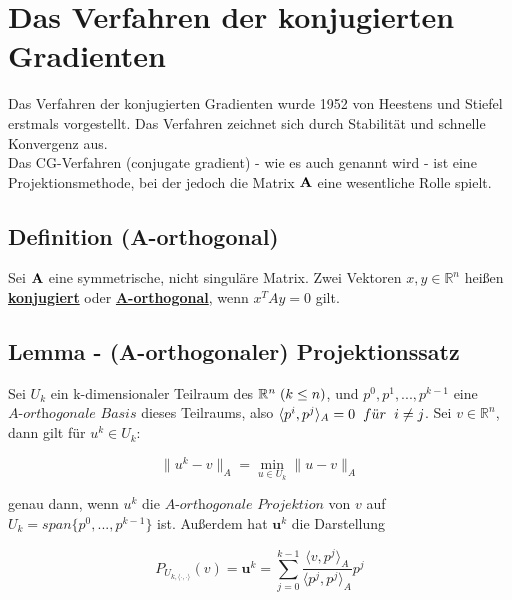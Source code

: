 \label{img.Jacobi3}

\section{Das Verfahren der konjugierten Gradienten}\label{s.Das Verfahren der konjugierten Gradienten}

Das Verfahren der konjugierten Gradienten wurde 1952 von Heestens und Stiefel erstmals vorgestellt. Das Verfahren zeichnet sich durch Stabilität und schnelle Konvergenz aus. \\
Das CG-Verfahren (conjugate gradient) - wie es auch genannt wird - ist eine Projektionsmethode, bei der jedoch die Matrix ${\textbf{A}}$ eine wesentliche Rolle spielt.

\subsection{Definition (A-orthogonal)}\label{ss.A-orthogonal}
Sei ${\textbf{A}}$ eine symmetrische, nicht singuläre Matrix. Zwei Vektoren $x,y \in \mathbb{R}^{n}$ heißen \underline{\textbf{konjugiert}} oder \underline{\textbf{A-orthogonal}}, wenn $x^{T}Ay = 0$ gilt.

\subsection{Lemma - (A-orthogonaler) Projektionssatz}\label{s.Projektionssatz}

Sei $U_{k}$ ein k-dimensionaler Teilraum des $\mathbb{R}^{n} \hspace{1mm} (k \le n)$, und $p^{0}, p^{1},...,p^{k-1}$ eine $\textit{A-orthogonale Basis}$ dieses Teilraums, also $\langle p^{i}, p^{j} \rangle _{A} = 0 \hspace{2mm} f\ddot{u}r \hspace{2mm} i \ne j$. Sei $v \in \mathbb{R}^{n}$, dann gilt für $u^{k} \in U_{k}$:

\begin{equation}
\|u^{k} - v\|_{A} = \underset{u \in U_{k}}{\min} \|u - v\|_{A}
\end{equation}

genau dann, wenn $u^{k}$ die $\textit{A-orthogonale Projektion}$ von $v$ auf $U_{k} = span\{p^{0},...,p^{k-1}\}$ ist. Außerdem hat $\textbf{u}^{k}$ die Darstellung

\begin{equation}
P_{U_{k,\langle \cdot,\cdot \rangle}}(v) = \textbf{u}^{k} = \sum_{j=0}^{k-1} \frac {\langle v, p^{j} \rangle _{A}} {\langle p^{j}, p^{j} \rangle _{A}} p^{j}
\end{equation}

